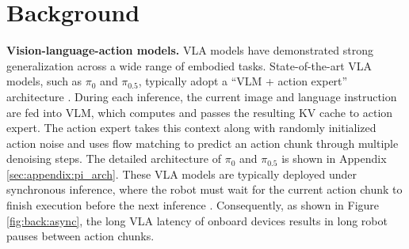 \section{Background}



\textbf{Vision-language-action models.}
VLA models have demonstrated strong generalization across a wide range of embodied tasks. State-of-the-art VLA models, such as $\pi_{0}$ and $\pi_{0.5}$, typically adopt a ``VLM + action expert'' architecture \cite{black2024pi_0,intelligence2025pi_05,community2026starvla,bjorck2025gr00t,chen2026dial,liu2026latent,yu2026ac,chen2025fast}. 
During each inference, the current image and language instruction are fed into VLM, which computes and passes the resulting KV cache to action expert. The action expert takes this context along with randomly initialized action noise and uses flow matching to predict an action chunk through multiple denoising steps. The detailed architecture of $\pi_{0}$ and $\pi_{0.5}$ is shown in Appendix \ref{sec:appendix:pi_arch}.
These VLA models are typically deployed under synchronous inference, where the robot must wait for the current action chunk to finish execution before the next inference \cite{black2026real}. Consequently, as shown in Figure \ref{fig:back:async}, the long VLA latency of onboard devices results in long robot pauses between action chunks.



